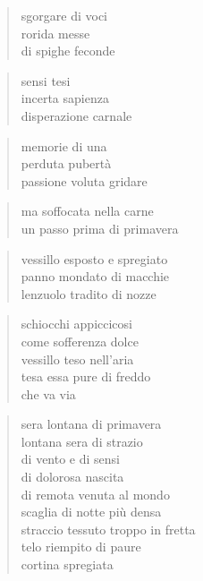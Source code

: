 
\begin{verse}
    sgorgare di voci\\
    rorida messe\\
    di spighe feconde
\end{verse}

\begin{verse}
    sensi tesi\\
    incerta sapienza\\
    disperazione carnale
\end{verse}

\begin{verse}
    memorie di una\\
    perduta pubertà\\
    passione voluta gridare
\end{verse}

\begin{verse}
    ma soffocata nella carne\\
    un passo prima di primavera
\end{verse}

\clearpage


\begin{verse}
    vessillo esposto e spregiato\\
    panno mondato di macchie\\
    lenzuolo tradito di nozze
\end{verse}

\begin{verse}
    schiocchi appiccicosi\\
    come sofferenza dolce\\
    vessillo teso nell'aria\\
    tesa essa pure di freddo\\
    che va via
\end{verse}

\begin{verse}
    sera lontana di primavera\\
    lontana sera di strazio\\
    di vento e di sensi\\
    di dolorosa nascita\\
    di remota venuta al mondo\\
    scaglia di notte più densa\\
    straccio tessuto troppo in fretta\\
    telo riempito di paure\\
    cortina spregiata
\end{verse}

